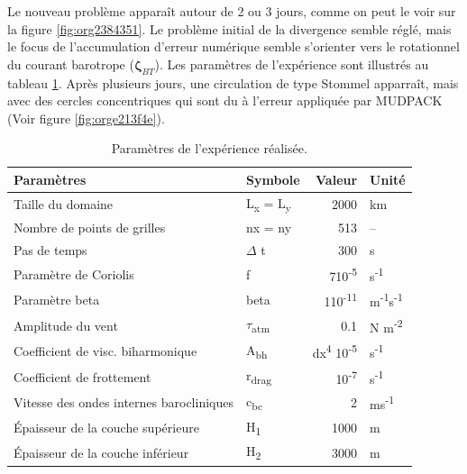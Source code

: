 \documentclass[10pt]{article}
\numberwithin{equation}{section}
\begin{document}
Le nouveau problème apparaît autour de 2 ou 3 jours, comme on peut le voir sur la figure \ref{fig:org2384351}.
Le problème initial de la divergence semble réglé, mais le focus de l'accumulation d'erreur numérique semble s'orienter vers le rotationnel du courant barotrope (\(\boldsymbol{\zeta}_{BT}\)).
Les paramètres de l'expérience sont illustrés au tableau \ref{tab:orge6d199e}.
Après plusieurs jours, une circulation de type Stommel apparraît, mais avec des cercles concentriques qui sont du à l'erreur appliquée par MUDPACK (Voir figure \ref{fig:orge213f4e}).

\begin{table}[htbp]
\caption{\label{tab:orge6d199e}Paramètres de l'expérience réalisée.}
\centering
\begin{tabular}{llrl}
\hline
\hline
Paramètres & Symbole & Valeur & Unité\\[0pt]
\hline
Taille du domaine & L\textsubscript{x} = L\textsubscript{y} & 2000 & km\\[0pt]
Nombre de points de grilles & nx = ny & 513 & --\\[0pt]
Pas de temps & \(\Delta\) t & 300 & s\\[0pt]
Paramètre de Coriolis & f & 7\texttimes{}10\textsuperscript{-5} & s\textsuperscript{-1}\\[0pt]
Paramètre beta & beta & 1\texttimes{}10\textsuperscript{-11} & m\textsuperscript{-1}s\textsuperscript{-1}\\[0pt]
Amplitude du vent & \(\tau\)\textsubscript{atm} & 0.1 & N m\textsuperscript{-2}\\[0pt]
Coefficient de visc. biharmonique & A\textsubscript{bh} & dx\textsuperscript{4} \texttimes{}10\textsuperscript{-5} & s\textsuperscript{-1}\\[0pt]
Coefficient de frottement & r\textsubscript{drag} & 10\textsuperscript{-7} & s\textsuperscript{-1}\\[0pt]
Vitesse des ondes internes barocliniques & c\textsubscript{bc} & 2 & ms\textsuperscript{-1}\\[0pt]
Épaisseur de la couche supérieure & H\textsubscript{1} & 1000 & m\\[0pt]
Épaisseur de la couche inférieur & H\textsubscript{2} & 3000 & m\\[0pt]
\hline
\end{tabular}
\end{table}
\end{document}
